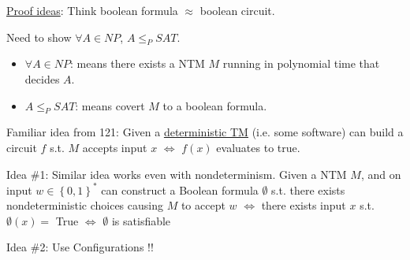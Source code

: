 \documentclass[twoside]{article}
\newcommand{\set}[1]{\left \{ #1 \right \}}
\begin{document}
\underline{Proof ideas}: Think boolean formula $\approx$ boolean circuit.

Need to show $\forall A \in NP$, $A \leq_{P} SAT$.

\begin{itemize}
  \item $\forall A \in NP$: means there exists a \textsf{NTM} $M$ running in polynomial time that decides $A$.
  \item $A \leq_{P} SAT$: means covert $M$ to a boolean formula.
\end{itemize}

Familiar idea from 121: Given a \underline{deterministic \textsf{TM}} (i.e. some software) can build a circuit $f$ s.t. $M$ accepts input $x$ $\Leftrightarrow$ $f(x)$ evaluates to true.

Idea \#1: Similar idea works even with nondeterminism. Given a \textsf{NTM} $M$, and on input $w \in \set{0, 1}^*$ can construct a Boolean formula $\emptyset$ s.t. there exists nondeterministic choices causing $M$ to accept $w$ $\Leftrightarrow$ there exists input $x$ s.t. $\emptyset(x) =$ True $\Leftrightarrow$ $\emptyset$ is satisfiable

Idea \#2: Use Configurations !!
\end{document}

